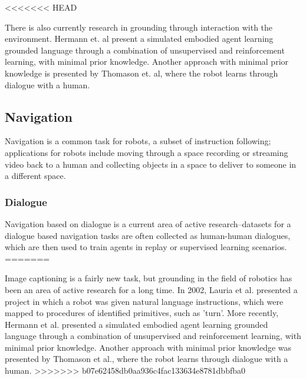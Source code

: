 \documentclass{article}
\begin{document}
<<<<<<< HEAD

There is also currently research in grounding through interaction with the environment. Hermann et. al present a simulated embodied agent learning grounded language through a combination of unsupervised and reinforcement learning, with minimal prior knowledge\cite{hermann2017grounded}. Another approach with minimal prior knowledge is presented by Thomason et. al, where the robot learns through dialogue with a human\cite{thomason2019grounded}.

\subsection{Navigation}
Navigation is a common task for robots, a subset of instruction following; applications for robots include moving through a space recording or streaming video back to a human and collecting objects in a space to deliver to someone in a different space.


\subsubsection{Dialogue}
Navigation based on dialogue is a current area of active research--datasets for a dialogue based navigation tasks are often collected as human-human dialogues, which are then used to train agents in replay or supervised learning scenarios. 
=======

Image captioning is a fairly new task, but grounding in the field of robotics has been an area of active research for a long time. In 2002, Lauria et al. presented a project in which a robot was given natural language instructions, which were mapped to procedures of identified primitives, such as 'turn'\cite{lauria2002}. More recently, Hermann et al. presented a simulated embodied agent learning grounded language through a combination of unsupervised and reinforcement learning, with minimal prior knowledge\cite{hermann2017grounded}. Another approach with minimal prior knowledge was presented by Thomason et al., where the robot learns through dialogue with a human\cite{thomason2019grounded}.
>>>>>>> b07e62458db0aa936c4fac133634e8781dbbfba0
\end{document}
